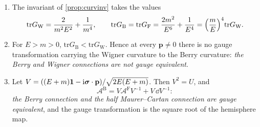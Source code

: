 \begin{theorem}\label{thm:gaugeineq}\ver\
\begin{enumerate}[label=(\roman*)]
\item The invariant of \cref{prop:curvinv} takes the values
\[
\mathrm{tr}G_{\mathrm W}=\frac{2}{m^2E^2}+\frac1{m^4},\qquad \mathrm{tr}G_{\mathrm B}=\mathrm{tr}G_{\mathrm F}=\frac{2m^2}{E^6}+\frac1{E^4}=\Bigl(\frac mE\Bigr)^4\mathrm{tr}G_{\mathrm W}.
\]
\item For $E>m>0$, $\mathrm{tr}G_{\mathrm B}<\mathrm{tr}G_{\mathrm W}$. Hence at every $\mathbf p\neq0$ there is no gauge transformation carrying the Wigner curvature to the Berry curvature: \emph{the Berry and Wigner connections are not gauge equivalent}.
\item Let $V=((E+m)\mathbf 1-\mathrm{i}\boldsymbol{\sigma}\cdot\mathbf p)/\sqrt{2E(E+m)}$. Then $V^2=U$, and
\[
\mathcal A^{\mathrm B}=V\mathcal A^{\mathrm F}V^{-1}+V\,\dd V^{-1}:
\]
\emph{the Berry connection and the half Maurer--Cartan connection are gauge equivalent}, and the gauge transformation is the square root of the hemisphere map.
\end{enumerate}
\end{theorem}
